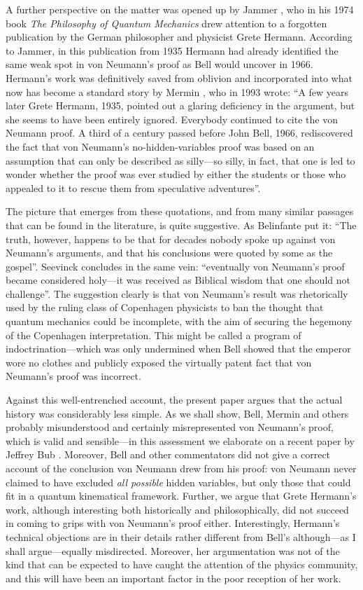 \documentclass[11pt]{article}
\begin{document}
A further perspective on the matter was opened up by Jammer \cite{jammer}, who in his 1974 book \emph{The Philosophy of Quantum Mechanics} drew attention to a forgotten publication by the German philosopher and physicist Grete Hermann. According to Jammer, in this publication from 1935 Hermann had already identified the same weak spot in von Neumann's proof as Bell would uncover in 1966. Hermann's work was definitively saved from oblivion and incorporated into what now has become a standard story by Mermin \cite{mermin}, who in 1993 wrote: ``A few years later Grete Hermann, 1935, pointed out a glaring deficiency in the argument, but she seems to have been entirely ignored. Everybody continued to cite the von Neumann proof. A third of a century passed before John Bell, 1966, rediscovered the fact that von Neumann's no-hidden-variables proof was based on an assumption that can only be described as silly---so silly, in fact, that one is led to wonder whether the proof was ever studied by either the students or those who appealed to it to rescue them from speculative adventures''.

The picture that emerges from these quotations, and from many similar passages that can be found in the literature, is quite suggestive. As Belinfante \cite {belinfante} put it: ``The truth, however, happens to be that for decades nobody spoke up against von Neumann's arguments, and that his conclusions were quoted by some as the gospel''. Seevinck \cite{seevinck} concludes in the same vein: ``eventually von Neumann's proof became considered holy---it was received as Biblical wisdom that one should not challenge''.  The suggestion clearly is that von Neumann's result was rhetorically used by the ruling class of Copenhagen physicists to ban the thought that quantum mechanics could be incomplete, with the aim of securing the hegemony of the Copenhagen interpretation. This might be called a program of indoctrination---which was only undermined when Bell showed that the emperor wore no clothes and publicly exposed the virtually patent fact that von Neumann's proof was incorrect.

Against this well-entrenched account, the present paper argues that the actual history was considerably less simple. As we shall show, Bell, Mermin and others probably misunderstood and certainly misrepresented von Neumann's proof, which is valid and sensible---in this assessment we elaborate on a recent paper by Jeffrey Bub \cite{bub}. Moreover, Bell and other commentators did not give a correct account of the conclusion von Neumann drew from his proof: von Neumann never claimed to have excluded \emph{all possible} hidden variables, but only those that could fit in a quantum kinematical framework. Further, we argue that Grete Hermann's work, although interesting both historically and philosophically, did not succeed in coming to grips with von Neumann's proof either. Interestingly, Hermann's technical objections are in their details rather different from Bell's although---as I shall argue---equally misdirected. Moreover, her argumentation was not of the kind that can be expected to have caught the attention of the physics community, and this will have been an important factor in the poor reception of her work.
\end{document}
